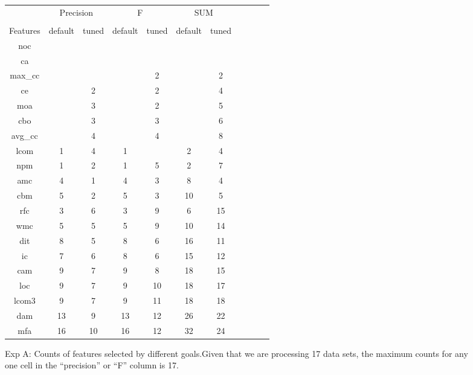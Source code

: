 \documentclass{acm_proc_article-sp}
\begin{document}
\begin{figure}[!t]

\renewcommand{\baselinestretch}{0.8}
\scriptsize
\centering
  \begin{tabular}{c|c c|c c|c c|c c| c c }
  
    &   \multicolumn{2}{c|}{Precision} & \multicolumn{2}{c|}{F} &  \multicolumn{2}{c|}{SUM}\\
 &&&&&&&\\
Features&   
  default
& tuned
& default
& tuned
& default
& tuned
\\\hline
 
noc &  &  &  &  & & & \\
ca & &  &  &  &  &\\
max\_cc&  &  & & 2& & 2\\
ce& & 2& & 2&  &   4\\
moa& & 3& & 2& &  5\\
cbo& & 3& & 3& &  6\\
avg\_cc & & 4& & 4& &  8\\
lcom& 1& 4& 1& & 2 & 4\\
npm& 1& 2& 1& 5& 2& 7\\
amc& 4& 1& 4& 3& 8&4\\
cbm& 5& 2& 5& 3&10 &  5\\
rfc& 3& 6& 3& 9& 6 &  15\\
wmc& 5& 5& 5& 9& 10& 14\\
dit& 8& 5& 8& 6& 16 & 11\\
ic& 7& 6& 8& 6& 15&  12\\
cam& 9& 7& 9& 8& 18& 15\\
loc& 9& 7& 9& 10& 18 &  17\\
lcom3& 9& 7& 9& 11& 18 & 18\\
dam& 13& 9& 13& 12& 26 &  22\\
mfa& 16& 10& 16& 12& 32 &  24\\

  \end{tabular}
    \caption{ Exp A: Counts of features selected by different goals.Given that we are processing 17 data sets, the maximum counts for any 
one cell in the ``precision'' or ``F'' column is 17.  
    }\label{fig:counts}
\end{figure}
\end{document}
